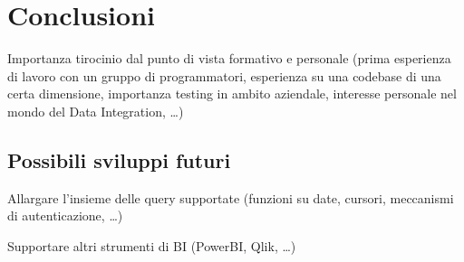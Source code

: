 \chapter{Conclusioni}
\label{cha:conclusions}

Importanza tirocinio dal punto di vista formativo e personale (prima esperienza di lavoro con un gruppo di programmatori, 
esperienza su una codebase di una certa dimensione, importanza testing in ambito aziendale, interesse personale nel mondo
del Data Integration, \dots)

\section{Possibili sviluppi futuri}
\label{sec:conclusions_future}
Allargare l'insieme delle query supportate (funzioni su date, cursori, meccanismi di autenticazione, \dots)

Supportare altri strumenti di BI (PowerBI, Qlik, \dots)